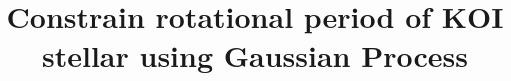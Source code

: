 \documentclass{aastex62}
\begin{document}
\title{Constrain rotational period of KOI stellar using Gaussian Process}


\end{document}
